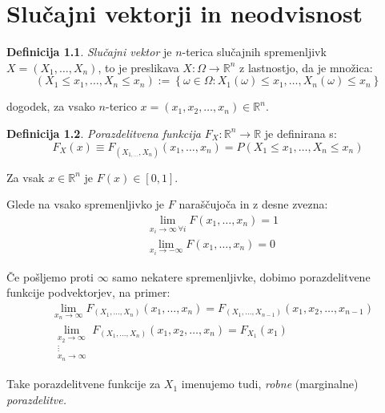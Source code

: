 \documentclass[12pt]{book}
\def\n{\noindent}
\theoremstyle{definition}
\newtheorem{definicija}{Definicija}
\theoremstyle{plain}
\theoremstyle{plain}
\theoremstyle{plain}
\theoremstyle{remark}
\begin{document}
\chapter{Slučajni vektorji in neodvisnost}

\begin{definicija}
    \emph{Slučajni vektor} je $n$-terica slučajnih spremenljivk $X=\left(X_1, \ldots, X_n\right)$, to je preslikava $X:\Omega \to \mathbb{R}^n$ z lastnostjo, da je množica: 
    $$
    \left(X_1 \leq x_1, \ldots, X_n \leq x_n\right):=\left\{\omega \in \Omega: X_1(\omega) \leq x_1,\ldots, X_n(\omega) \leq x_n\right\}
    $$

    dogodek, za vsako $n$-terico $x=\left(x_1, x_2, \ldots, x_n\right) \in \mathbb{R}^n$.
\end{definicija}

\begin{definicija}
    \emph{Porazdelitvena funkcija} $F_X: \mathbb{R}^n \to \mathbb{R}$ je definirana s:
    $$
    F_X(x) \equiv F_{\left(X_{1, \ldots}, X_n\right)}\left(x_1, \ldots, x_n\right)=P\left(X_1 \leq x_1, \ldots, X_n \leq x_n\right)
    $$
\end{definicija}

\n Za vsak $x \in \mathbb{R}^n$ je $F(x) \in[0, 1]$.

\n Glede na vsako spremenljivko je $F$ naraščujoča in z desne zvezna:
$$
\begin{aligned}
    &\lim _{x_i \to \infty \, \forall i} F\left(x_1, \ldots, x_n\right)=1 \\
    &\lim _{x_i \rightarrow-\infty} F\left(x_1, \ldots, x_n\right)=0
\end{aligned}
$$

\n Če pošljemo proti $\infty$ samo nekatere spremenljivke, dobimo porazdelitvene funkcije podvektorjev, na primer:
$$
\begin{aligned}
    &\lim _{x_n \to \infty} F_{\left(X_1, \ldots, X_{n}\right)}\left(x_1, \dots , x_n\right)=F_{\left(X_1, \ldots, X_{n-1}\right)}\left(x_1, x_2, \ldots, x_{n-1}\right) \\
    &\lim _{\substack{x_2 \to \infty \\ \vdots \\x_n \to \infty}} F_{\left(X_1, \ldots, X_{n}\right)}\left(x_1, x_2, \ldots, x_n\right)=F_{X_1}\left(x_1\right)
\end{aligned}
$$

Take porazdelitvene funkcije za $X_1$ imenujemo tudi, \emph{robne} (marginalne) \emph{porazdelitve.}
\end{document}
